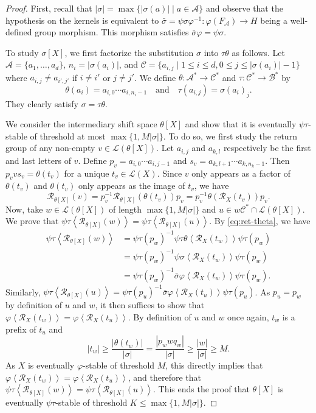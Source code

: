 \documentclass[10pt,a4paper]{amsart}
\newcommand*{\cA}{\mathcal{A}}
\newcommand*{\cB}{\mathcal{B}}
\newcommand*{\cC}{\mathcal{C}}
\newcommand*{\from}{\colon}
\newcommand*{\gen}[1]{\left\langle #1\right\rangle}
\newcommand*{\lang}{\mathcal{L}}
\newcommand*{\ret}{\mathcal{R}}
\begin{document}
\begin{proof}
    First, recall that $|\sigma| = \max\{|\sigma(a)| \mid a \in \cA\}$ and observe that the hypothesis on the kernels is equivalent to $\bar\sigma = \psi\sigma\varphi^{-1}\from \varphi(F_\cA) \to H$ being a well-defined group morphism. This morphism satisfies $\bar\sigma\varphi = \psi\sigma$.
    
    To study $\sigma[X]$, we first factorize the substitution $\sigma$ into $\tau\theta$ as follows.
    Let $\cA = \{a_1, \dots, a_d\}$, $n_i = |\sigma(a_i)|$, and $\cC = \{a_{i,j} \mid 1 \leq i \leq d, 0 \leq j \leq |\sigma(a_i)|-1\}$ where $a_{i,j} \ne a_{i',j'}$ if $i \ne i'$ or $j \ne j'$. We define $\theta\from \cA^*\to \cC^*$ and $\tau\from \cC^*\to \cB^*$ by
    \[
        \theta(a_i) = a_{i,0} \cdots a_{i,n_i-1}\quad\text{and}\quad \tau(a_{i,j}) = \sigma(a_i)_j.
    \]
    They clearly satisfy $\sigma = \tau\theta$.
    
    We consider the intermediary shift space $\theta[X]$ and show that it is eventually $\psi\tau$-stable of threshold at most $\max\{1,M|\sigma|\}$. To do so, we first study the return group of any non-empty $v \in \lang(\theta[X])$. Let $a_{i,j}$ and $a_{k,l}$ respectively be the first and last letters of $v$. Define $p_v = a_{i,0}\cdots a_{i,j-1}$ and $s_v = a_{k,l+1}\cdots a_{k,n_k-1}$. Then $p_vvs_v = \theta(t_v)$ for a unique $t_v\in\lang(X)$. Since $v$ only appears as a factor of $\theta(t_v)$ and $\theta(t_v)$ only appears as the image of $t_v$, we have
    \begin{equation}\label{eq:ret-theta}
        \ret_{\theta[X]}(v) = p_v^{-1}\ret_{\theta[X]}(\theta(t_v))p_v = p_v^{-1}\theta(\ret_X(t_v))p_v.
    \end{equation}
    Now, take $w \in \lang(\theta[X])$ of length $\max\{1,M|\sigma|\}$ and $u \in w\cC^* \cap \lang(\theta[X])$. We prove that $\psi\tau\gen{\ret_{\theta[X]}(w)} = \psi\tau\gen{\ret_{\theta[X]}(u)}$. By \cref{eq:ret-theta}, we have
    \begin{align*}
        \psi\tau\gen{\ret_{\theta[X]}(w)}
        &= \psi\tau(p_w)^{-1}\psi\tau\theta\gen{\ret_X(t_w)}\psi\tau(p_w) \\
        &= \psi\tau(p_w)^{-1}\psi\sigma\gen{\ret_X(t_w)}\psi\tau(p_w) \\
        &= \psi\tau(p_w)^{-1}\bar\sigma\varphi\gen{\ret_X(t_w)}\psi\tau(p_w).
    \end{align*}
    Similarly, $\psi\tau\gen{\ret_{\theta[X]}(u)} = \psi\tau(p_u)^{-1}\bar\sigma\varphi\gen{\ret_X(t_u)}\psi\tau(p_u)$.
    As $p_u = p_w$ by definition of $u$ and $w$, it then suffices to show that $\varphi\gen{\ret_X(t_w)} = \varphi\gen{\ret_X(t_u)}$. By definition of $u$ and $w$ once again, $t_w$ is a prefix of $t_u$ and
    \[
        |t_w| \geq \frac{|\theta(t_w)|}{|\sigma|} = \frac{|p_wwq_w|}{|\sigma|} \geq \frac{|w|}{|\sigma|}
        \geq M.
    \]
    As $X$ is eventually $\varphi$-stable of threshold $M$, this directly implies that $\varphi\gen{\ret_X(t_w)} = \varphi\gen{\ret_X(t_u)}$, and therefore that $\psi\tau\gen{\ret_{\theta[X]}(w)} = \psi\tau\gen{\ret_{\theta[X]}(u)}$. This ends the proof that $\theta[X]$ is eventually $\psi\tau$-stable of threshold $K \leq \max\{1,M|\sigma|\}$.
    

\end{proof}
\end{document}
